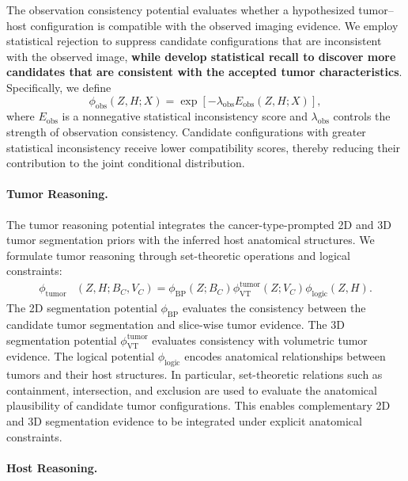 \documentclass[fleqn,10pt]{olplainarticle}
\begin{document}
The observation consistency potential
evaluates whether a hypothesized tumor--host
configuration is compatible with the
observed imaging evidence. We employ statistical rejection to suppress
candidate configurations that are inconsistent
with the observed image, \textbf{while develop statistical recall to discover more candidates that are consistent with the accepted tumor characteristics}.
Specifically, we define
\begin{equation}
\label{eq:observation_potential}
\phi_{\mathrm{obs}}(Z,H;X)
=
\exp\left[
-\lambda_{\mathrm{obs}}
E_{\mathrm{obs}}(Z,H;X)
\right],
\end{equation}
where $E_{\mathrm{obs}}$ is a nonnegative
statistical inconsistency score and
$\lambda_{\mathrm{obs}}$ controls the
strength of observation consistency.
Candidate configurations with greater
statistical inconsistency receive lower
compatibility scores, thereby reducing
their contribution to the joint conditional
distribution.

\paragraph{Tumor Reasoning.}

The tumor reasoning potential integrates
the cancer-type-prompted 2D and 3D tumor
segmentation priors with the inferred
host anatomical structures.
We formulate tumor reasoning through
set-theoretic operations and logical
constraints:
\begin{equation}
\label{eq:tumor_reasoning}
\begin{aligned}
\phi_{\mathrm{tumor}}
&(Z,H;B_C,V_C) =
\phi_{\mathrm{BP}}(Z;B_C)
\phi_{\mathrm{VT}}^{\mathrm{tumor}}(Z;V_C)
\phi_{\mathrm{logic}}(Z,H).
\end{aligned}
\end{equation}
The 2D segmentation potential
$\phi_{\mathrm{BP}}$ evaluates the
consistency between the candidate tumor
segmentation and slice-wise tumor evidence.
The 3D segmentation potential
$\phi_{\mathrm{VT}}^{\mathrm{tumor}}$
evaluates consistency with volumetric
tumor evidence.
The logical potential
$\phi_{\mathrm{logic}}$ encodes
anatomical relationships between tumors
and their host structures.
In particular, set-theoretic relations
such as containment, intersection,
and exclusion are used to evaluate
the anatomical plausibility of candidate
tumor configurations.
This enables complementary 2D and 3D
segmentation evidence to be integrated
under explicit anatomical constraints.

\paragraph{Host Reasoning.}
\end{document}
